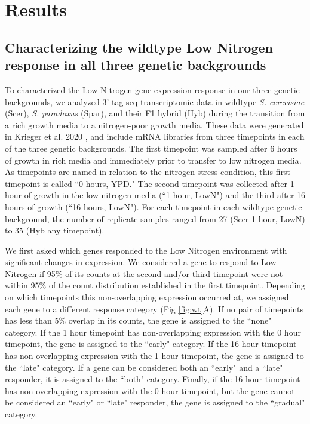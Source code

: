 \section{Results}

\subsection{Characterizing the wildtype Low Nitrogen response in all three genetic backgrounds}

To characterized the Low Nitrogen gene expression response in our three genetic backgrounds, we analyzed 3' tag-seq transcriptomic data in wildtype \textit{S. cerevisiae} (Scer), \textit{S. paradoxus} (Spar), and their F1 hybrid (Hyb) during the transition from a rich growth media to a nitrogen-poor growth media. These data were generated in Krieger et al. 2020 \cite{Krieger2020}, and include mRNA libraries from three timepoints in each of the three genetic backgrounds. The first timepoint was sampled after 6 hours of growth in rich media and immediately prior to transfer to low nitrogen media. As timepoints are named in relation to the nitrogen stress condition, this first timepoint is called ``0 hours, YPD." The second timepoint was collected after 1 hour of growth in the low nitrogen media (``1 hour, LowN") and the third after 16 hours of growth (``16 hours, LowN"). For each timepoint in each wildtype genetic background, the number of replicate samples ranged from 27 (Scer 1 hour, LowN) to 35 (Hyb any timepoint).

We first asked which genes responded to the Low Nitrogen environment with significant changes in expression. We considered a gene to respond to Low Nitrogen if 95\% of its counts at the second and/or third timepoint were not within 95\% of the count distribution established in the first timepoint. Depending on which timepoints this non-overlapping expression occurred at, we assigned each gene to a different response category (Fig \ref{fig:wt}A). If no pair of timepoints has less than 5\% overlap in its counts, the gene is assigned to the ``none" category. If the 1 hour timepoint has non-overlapping expression with the 0 hour timepoint, the gene is assigned to the ``early" category.  If the 16 hour timepoint has non-overlapping expression with the 1 hour timepoint, the gene is assigned to the ``late" category. If a gene can be considered both an ``early" and a ``late" responder, it is assigned to the ``both" category. Finally, if the 16 hour timepoint has non-overlapping expression with the 0 hour timepoint, but the gene cannot be considered an ``early" or ``late" responder, the gene is assigned to the ``gradual" category.

